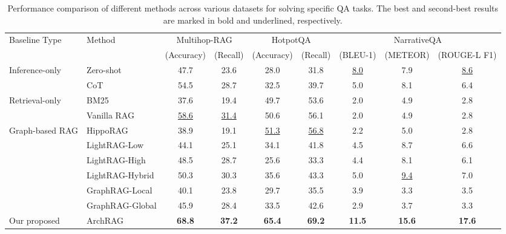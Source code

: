 \begin{table*}[ht]
    \centering    
    \caption{Performance comparison of different methods across various datasets for solving specific QA tasks. The best and second-best results are marked in bold and underlined, respectively.}
    \begin{tabular}{ll ccccccc}
        \toprule
        \multirow{2}{*}{Baseline Type} & \multirow{2}{*}{Method} & \multicolumn{2}{c}{Multihop-RAG} & \multicolumn{2}{c}{HotpotQA} & \multicolumn{3}{c}{NarrativeQA} \\
        \cmidrule(lr){3-4} \cmidrule(lr){5-6} \cmidrule(lr){7-9}
        & &(Accuracy) & (Recall) & (Accuracy) & (Recall) & (BLEU-1) & (METEOR) & (ROUGE-L F1)\\
\midrule
\multirow{2}{*}{Inference-only} & {Zero-shot} & 47.7 & 23.6 & 28.0 & 31.8 & \underline{8.0} & 7.9 & \underline{8.6} \\
& {CoT} & 54.5 & 28.7 & 32.5 & 39.7 & 5.0 & 8.1 & 6.4 \\
\midrule
\multirow{2}{*}{Retrieval-only} 
& {BM25} & 37.6 & 19.4 & 49.7 & 53.6 & 2.0 & 4.9  & 2.8 \\
& {Vanilla RAG} & \underline{58.6} & \underline{31.4} & 50.6 & 56.1 & 2.0 & 4.9 & 2.8 \\
\midrule
\multirow{6}{*}{Graph-based RAG} 
& {HippoRAG} & 38.9 & 19.1 & \underline{51.3} & \underline{56.8} & 2.2 & 5.0 & 2.8 \\
& {LightRAG-Low} & 44.1 & 25.1 & 34.1 & 41.8 & 4.5 & 8.7 & 6.6 \\
& {LightRAG-High} & 48.5 & 28.7 & 25.6 & 33.3 & 4.4 & 8.1 & 6.1 \\
& {LightRAG-Hybrid} & 50.3 & 30.3 & 35.6 & 43.3 & 5.0 & \underline{9.4} & 7.0 \\
& {GraphRAG-Local} & 40.1 & 23.8 & 29.7 & 35.5 & 3.9 & 3.3 & 3.5 \\
& {GraphRAG-Global}& 45.9 & 28.4 & 33.5 & 42.6 & 2.9 & 3.7 & 3.3 \\
\midrule
Our proposed & {ArchRAG} & {\bf 68.8} & {\bf 37.2 }& {\bf 65.4} & {\bf 69.2} & {\bf 11.5} & {\bf 15.6} & {\bf 17.6} \\
        \bottomrule
    \end{tabular}
    \label{tab:docqa}
\end{table*}




